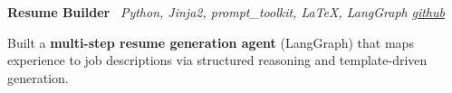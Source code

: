     \hspace{0.5em} \textbf{Resume Builder} \textbar \  \textit{Python, Jinja2, prompt\_toolkit, LaTeX, LangGraph}
\hfill \textit{\href{https://github.com/knarfthekant/resume_builder}{github}}
    \vspace{0.10 cm}
    \begin{onecolentry}
        \begin{highlights}
            \item Built a \textbf{multi-step resume generation agent} (LangGraph) that maps experience to job descriptions via structured reasoning and template-driven generation.

        \end{highlights}
    \end{onecolentry}
    \vspace{0.10 cm}

